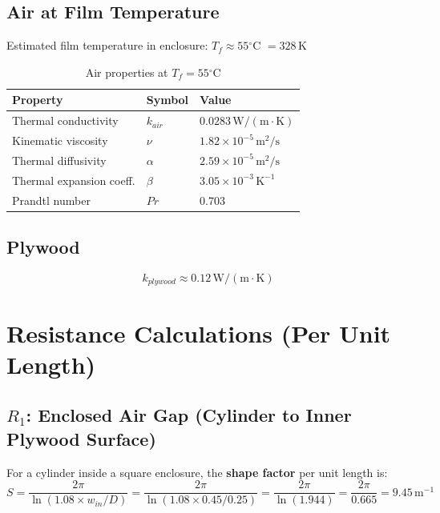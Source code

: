 \documentclass[11pt]{article}
\newcommand{\degC}{$^\circ$C}
\newcommand{\unit}[1]{\,\mathrm{#1}}
\begin{document}
\subsection{Air at Film Temperature}

Estimated film temperature in enclosure: $T_f \approx 55$\degC{} $= 328\unit{K}$

\begin{table}[h]
\centering
\caption{Air properties at $T_f = 55$\degC}
\begin{tabular}{lll}
\toprule
\textbf{Property} & \textbf{Symbol} & \textbf{Value} \\
\midrule
Thermal conductivity & $k_{air}$ & $0.0283\unit{W/(m \cdot K)}$ \\
Kinematic viscosity & $\nu$ & $1.82 \times 10^{-5}\unit{m^2/s}$ \\
Thermal diffusivity & $\alpha$ & $2.59 \times 10^{-5}\unit{m^2/s}$ \\
Thermal expansion coeff. & $\beta$ & $3.05 \times 10^{-3}\unit{K^{-1}}$ \\
Prandtl number & $Pr$ & 0.703 \\
\bottomrule
\end{tabular}
\end{table}

\subsection{Plywood}
\begin{equation}
    k_{plywood} \approx 0.12\unit{W/(m \cdot K)}
\end{equation}

\section{Resistance Calculations (Per Unit Length)}

\subsection{$R_1$: Enclosed Air Gap (Cylinder to Inner Plywood Surface)}

For a cylinder inside a square enclosure, the \textbf{shape factor} per unit length is:
\begin{equation}
    S = \frac{2\pi}{\ln(1.08 \times w_{in}/D)} = \frac{2\pi}{\ln(1.08 \times 0.45/0.25)} = \frac{2\pi}{\ln(1.944)} = \frac{2\pi}{0.665} = 9.45\unit{m^{-1}}
\end{equation}
\end{document}
